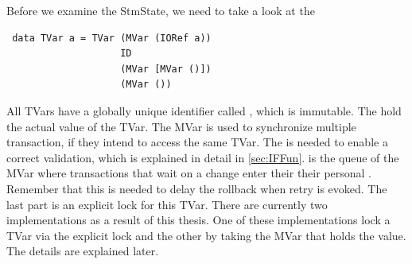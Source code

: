 Before we examine the StmState, we need to take a look at the 
\begin{lstlisting}
 data TVar a = TVar (MVar (IORef a))
                    ID
                    (MVar [MVar ()])
                    (MVar ())
\end{lstlisting}
All TVars have a globally unique identifier called , which is immutable. The  
hold the actual value of the TVar. The MVar is used to synchronize multiple transaction, if they intend to 
access the same TVar. The  is needed to enable a correct validation, which is explained in detail
in \ref{sec:IFFun}.  is the queue of the MVar where transactions that wait on a change
enter their their personal . Remember that this is needed to delay the rollback when retry
is evoked. The last part is an explicit lock for this TVar. There are currently two implementations as 
a result of this thesis. One of these implementations lock a TVar via 
the explicit lock and the other by taking the MVar that holds the value. The details are explained later. 

